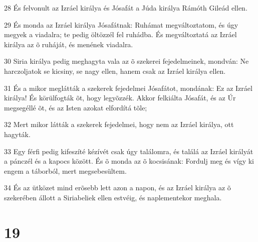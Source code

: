 \par 28 És felvonult az Izráel királya és Jósafát a Júda királya Rámóth Gileád ellen.
\par 29 És monda az Izráel királya Jósafátnak: Ruhámat megváltoztatom, és úgy megyek a viadalra; te pedig öltözzél fel ruhádba. És megváltoztatá az Izráel királya az õ ruháját, és menének viadalra.
\par 30 Siria királya pedig meghagyta vala az õ szekerei fejedelmeinek, mondván: Ne harczoljatok se kicsiny, se nagy ellen, hanem csak az Izráel királya ellen.
\par 31 És a mikor meglátták a szekerek fejedelmei Jósafátot, mondának: Ez az Izráel királya! És körülfogták õt, hogy legyõzzék. Akkor felkiálta Jósafát, és az Úr megsegéllé õt, és az Isten azokat elfordítá tõle;
\par 32 Mert mikor látták a szekerek fejedelmei, hogy nem az Izráel királya, ott hagyták.
\par 33 Egy férfi pedig kifeszíté kézívét csak úgy találomra, és találá az Izráel királyát a pánczél és a kapocs között. És õ monda az õ kocsisának: Fordulj meg és vígy ki engem a táborból, mert megsebesültem.
\par 34 És az ütközet mind erõsebb lett azon a napon, és az Izráel királya az õ szekerében állott a Siriabeliek ellen estvéig, és naplementekor meghala.

\chapter{19}

